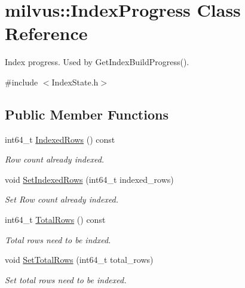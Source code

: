 \hypertarget{classmilvus_1_1_index_progress}{}\section{milvus\+:\+:Index\+Progress Class Reference}
\label{classmilvus_1_1_index_progress}


Index progress. Used by Get\+Index\+Build\+Progress().  




{\ttfamily \#include $<$Index\+State.\+h$>$}

\subsection*{Public Member Functions}
\begin{DoxyCompactItemize}
\item 
\mbox{\label{classmilvus_1_1_index_progress_acc27b58e4c5429437f8b457b635a9f1b}} 
int64\+\_\+t \hyperlink{classmilvus_1_1_index_progress_acc27b58e4c5429437f8b457b635a9f1b}{Indexed\+Rows} () const
\begin{DoxyCompactList}\small\item\em Row count already indexed. \end{DoxyCompactList}\item 
\mbox{\label{classmilvus_1_1_index_progress_a0d0f0e28ab00445860faf53d8fc1ff8b}} 
void \hyperlink{classmilvus_1_1_index_progress_a0d0f0e28ab00445860faf53d8fc1ff8b}{Set\+Indexed\+Rows} (int64\+\_\+t indexed\+\_\+rows)
\begin{DoxyCompactList}\small\item\em Set Row count already indexed. \end{DoxyCompactList}\item 
\mbox{\label{classmilvus_1_1_index_progress_a41e6f0af1e26e24fe556815caa6c508b}} 
int64\+\_\+t \hyperlink{classmilvus_1_1_index_progress_a41e6f0af1e26e24fe556815caa6c508b}{Total\+Rows} () const
\begin{DoxyCompactList}\small\item\em Total rows need to be indxed. \end{DoxyCompactList}\item 
\mbox{\label{classmilvus_1_1_index_progress_a4c27e2ef27843385fab85b10cda65c5f}} 
void \hyperlink{classmilvus_1_1_index_progress_a4c27e2ef27843385fab85b10cda65c5f}{Set\+Total\+Rows} (int64\+\_\+t total\+\_\+rows)
\begin{DoxyCompactList}\small\item\em Set total rows need to be indexed. \end{DoxyCompactList}\end{DoxyCompactItemize}


